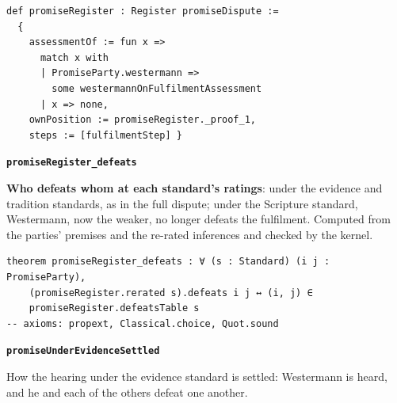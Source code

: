 \documentclass[11pt]{article}
\begin{document}
{\small\begin{verbatim}
def promiseRegister : Register promiseDispute :=
  {
    assessmentOf := fun x =>
      match x with
      | PromiseParty.westermann =>
        some westermannOnFulfilmentAssessment
      | x => none,
    ownPosition := promiseRegister._proof_1,
    steps := [fulfilmentStep] }
\end{verbatim}}
\par\medskip\noindent\textbf{\texttt{promise\allowbreak{}Register\_\allowbreak{}defeats}}\par\nobreak\noindent
\textbf{Who defeats whom at each standard’s ratings}: under the evidence and tradition standards, as in the full dispute; under the Scripture standard, Westermann, now the weaker, no longer defeats the fulfilment. Computed from the parties’ premises and the re-rated inferences and checked by the kernel.

{\small\begin{verbatim}
theorem promiseRegister_defeats : ∀ (s : Standard) (i j : PromiseParty),
    (promiseRegister.rerated s).defeats i j ↔ (i, j) ∈
    promiseRegister.defeatsTable s
-- axioms: propext, Classical.choice, Quot.sound
\end{verbatim}}
\par\medskip\noindent\textbf{\texttt{promise\allowbreak{}Under\allowbreak{}Evidence\allowbreak{}Settled}}\par\nobreak\noindent
How the hearing under the evidence standard is settled: Westermann is heard, and he and each of the others defeat one another.
\end{document}

